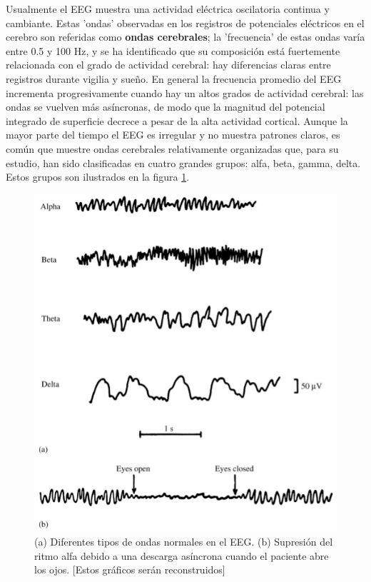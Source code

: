 \documentclass[12pt,a4paper]{mitthesis}
\begin{document}
Usualmente el EEG muestra una actividad el\'ectrica oscilatoria continua y cambiante.%
Estas 'ondas' observadas en los registros de potenciales el\'ectricos en el cerebro son referidas 
como \textbf{ondas cerebrales}; la 'frecuencia' de estas ondas var\'ia entre 0.5 y 100 Hz, y se ha 
identificado que su composici\'on est\'a fuertemente relacionada con el grado de actividad 
cerebral: hay diferencias claras entre registros durante vigilia y sue\~no.
En general la frecuencia promedio del EEG incrementa progresivamente cuando hay un altos grados 
de actividad cerebral: las ondas se vuelven m\'as as\'incronas, de modo que la magnitud del 
potencial integrado de superficie decrece a pesar de la alta actividad cortical.
Aunque la mayor parte del tiempo el EEG es irregular y no muestra patrones claros, es com\'un que 
muestre ondas cerebrales relativamente organizadas que, para su estudio, han sido clasificadas en 
cuatro grandes grupos: alfa, beta, gamma, delta.
Estos grupos son ilustrados en la figura \ref{ritmos}.

\begin{figure}
\centering
\includegraphics[width=0.5\linewidth]{figura_4.png} 
\caption{(a) Diferentes tipos de ondas normales en el EEG. (b) Supresi\'on del ritmo alfa debido a 
una descarga as\'incrona cuando el paciente abre los ojos.
[Estos gr\'aficos ser\'an reconstruidos]
}
\label{ritmos}
\end{figure}
\end{document}
